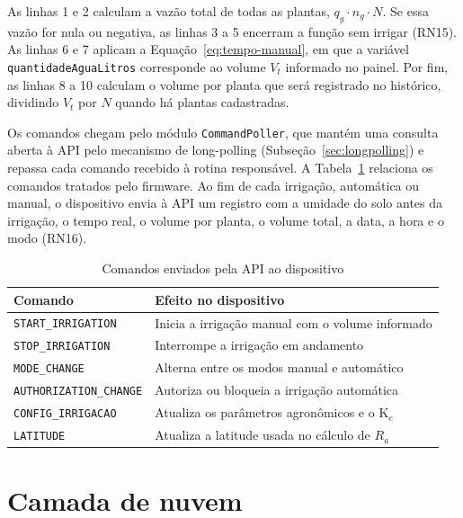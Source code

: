 As linhas 1 e 2 calculam a vazão total de todas as plantas, $q_g \cdot n_g \cdot N$. Se essa vazão for nula ou negativa, as linhas 3 a 5 encerram a função sem irrigar (RN15). As linhas 6 e 7 aplicam a Equação~\ref{eq:tempo-manual}, em que a variável \texttt{quantidadeAguaLitros} corresponde ao volume $V_t$ informado no painel. Por fim, as linhas 8 a 10 calculam o volume por planta que será registrado no histórico, dividindo $V_t$ por $N$ quando há plantas cadastradas.

Os comandos chegam pelo módulo \texttt{CommandPoller}, que mantém uma consulta aberta à API pelo mecanismo de long-polling (Subseção~\ref{sec:longpolling}) e repassa cada comando recebido à rotina responsável. A Tabela~\ref{tab:comandos} relaciona os comandos tratados pelo firmware. Ao fim de cada irrigação, automática ou manual, o dispositivo envia à API um registro com a umidade do solo antes da irrigação, o tempo real, o volume por planta, o volume total, a data, a hora e o modo (RN16).

\begin{table}[!htbp]
  \centering
  \caption{Comandos enviados pela API ao dispositivo}
  \label{tab:comandos}
  \small
  \renewcommand{\arraystretch}{1.2}
  \begin{tabularx}{\textwidth}{>{\raggedright\arraybackslash}p{4.4cm}
                               >{\raggedright\arraybackslash}X}
    \hline
    \textbf{Comando} & \textbf{Efeito no dispositivo} \\
    \hline
    \texttt{START\_IRRIGATION} & Inicia a irrigação manual com o volume informado \\
    \texttt{STOP\_IRRIGATION} & Interrompe a irrigação em andamento \\
    \texttt{MODE\_CHANGE} & Alterna entre os modos manual e automático \\
    \texttt{AUTHORIZATION\_CHANGE} & Autoriza ou bloqueia a irrigação automática \\
    \texttt{CONFIG\_IRRIGACAO} & Atualiza os parâmetros agronômicos e o K$_c$ \\
    \texttt{LATITUDE} & Atualiza a latitude usada no cálculo de $R_a$ \\
    \hline
  \end{tabularx}
\end{table}

\section{Camada de nuvem}
\label{sec:backend}


